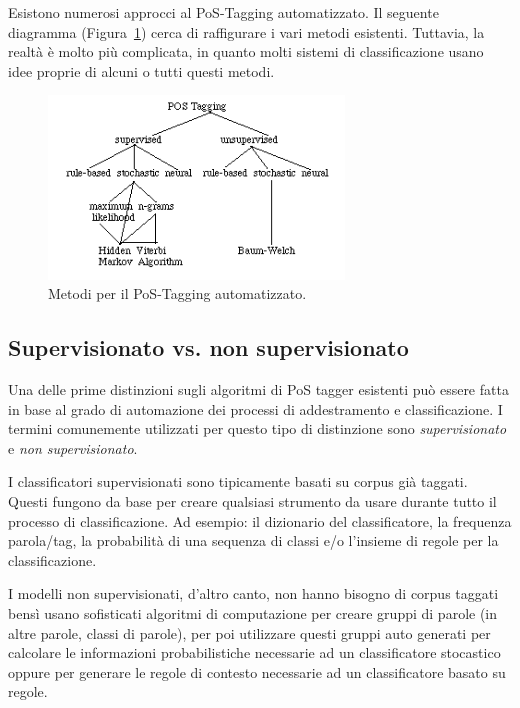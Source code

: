 Esistono numerosi approcci al PoS-Tagging automatizzato.
Il seguente diagramma (Figura~\ref{fig:feedforwardNeuralNetwork}) cerca di raffigurare i vari metodi esistenti.
Tuttavia, la realt\`a \`e molto pi\`u complicata, in quanto molti sistemi di classificazione usano idee proprie di alcuni o tutti questi metodi.

\begin{figure}[tp]
  \centering
  \begin{center}
    \includegraphics[width=0.7\textwidth]{./images/tagging_overview.png}
  \end{center}
  \caption{Metodi per il PoS-Tagging automatizzato.}
  \label{fig:feedforwardNeuralNetwork}
\end{figure}

\subsection{Supervisionato vs. non supervisionato}
\nocite{BrillMarcus:1993}
\nocite{Brill:1995}
\nocite{Shutze:1993}

Una delle prime distinzioni sugli algoritmi di PoS tagger esistenti pu\`o essere fatta in base al grado di automazione dei processi di addestramento e classificazione.
I termini comunemente utilizzati per questo tipo di distinzione sono \emph{supervisionato} e \emph{non supervisionato}.

I classificatori supervisionati sono tipicamente basati su corpus gi\`a taggati.
Questi fungono da base per creare qualsiasi strumento da usare durante tutto il processo di classificazione.
Ad esempio: il dizionario del classificatore, la frequenza parola/tag, la probabilit\`a di una sequenza di classi e/o l'insieme di regole per la classificazione.

I modelli non supervisionati, d'altro canto, non hanno bisogno di corpus taggati bens\`i usano sofisticati algoritmi di computazione per creare gruppi di parole (in altre parole, classi di parole), per poi utilizzare questi gruppi auto generati per calcolare le informazioni probabilistiche necessarie ad un classificatore stocastico oppure per generare le regole di contesto necessarie ad un classificatore basato su regole.


